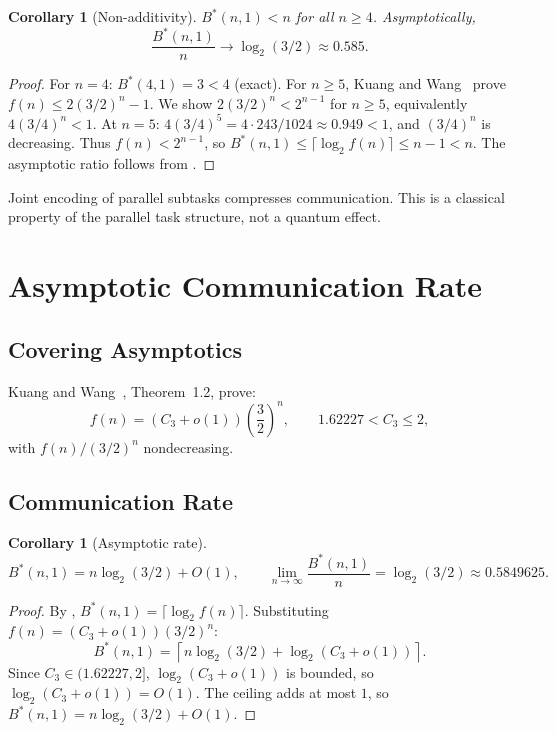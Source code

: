 \documentclass[11pt,letterpaper]{article}
\newtheorem{corollary}[theorem]{Corollary}
\newcommand{\Bstar}{B^{\!*}}
\begin{document}
\begin{corollary}[Non-additivity]
\label{cor:compress}
$\Bstar(n,1) < n$ for all $n \geq 4$. Asymptotically,
\[
  \frac{\Bstar(n,1)}{n} \to \log_2(3/2) \approx 0.585.
\]
\end{corollary}

\begin{proof}
For $n=4$: $\Bstar(4,1) = 3 < 4$ (exact). For $n \geq 5$, Kuang and Wang~\cite{kuangwang2026} prove $f(n) \leq 2(3/2)^n - 1$. We show $2(3/2)^n < 2^{n-1}$ for $n \geq 5$, equivalently $4(3/4)^n < 1$. At $n=5$: $4(3/4)^5 = 4 \cdot 243/1024 \approx 0.949 < 1$, and $(3/4)^n$ is decreasing. Thus $f(n) < 2^{n-1}$, so $\Bstar(n,1) \leq \lceil \log_2 f(n) \rceil \leq n-1 < n$. The asymptotic ratio follows from .
\end{proof}

Joint encoding of parallel subtasks compresses communication. This is a classical property of the parallel task structure, not a quantum effect.

\section{Asymptotic Communication Rate}
\label{sec:asymp}

\subsection{Covering Asymptotics}

Kuang and Wang~\cite{kuangwang2026}, Theorem~1.2, prove:
\[
  f(n) = (C_3 + o(1))\left(\frac{3}{2}\right)^n, \qquad 1.62227 < C_3 \leq 2,
\]
with $f(n)/(3/2)^n$ nondecreasing.

\subsection{Communication Rate}

\begin{corollary}[Asymptotic rate]
\label{cor:asymp}
\[
  \Bstar(n,1) = n \log_2(3/2) + O(1), \qquad \lim_{n \to \infty} \frac{\Bstar(n,1)}{n} = \log_2(3/2) \approx 0.5849625.
\]
\end{corollary}

\begin{proof}
By , $\Bstar(n,1) = \lceil \log_2 f(n) \rceil$. Substituting $f(n) = (C_3 + o(1))(3/2)^n$:
\[
  \Bstar(n,1) = \left\lceil n \log_2(3/2) + \log_2(C_3 + o(1)) \right\rceil.
\]
Since $C_3 \in (1.62227, 2]$, $\log_2(C_3 + o(1))$ is bounded, so $\log_2(C_3 + o(1)) = O(1)$. The ceiling adds at most $1$, so $\Bstar(n,1) = n \log_2(3/2) + O(1)$.
\end{proof}
\end{document}
